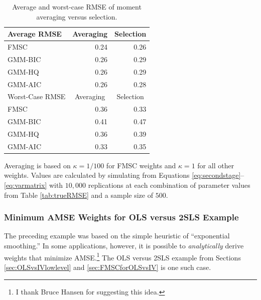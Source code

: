 \documentclass[12pt]{article}
\theoremstyle{definition}
\begin{document}
%
\begin{table}[!tbp]
 \begin{center}
\caption{Average and worst-case RMSE of moment averaging versus selection.}
\label{tab:avg}
\small
 \begin{tabular}{lrr}\hline\hline
\multicolumn{1}{l}{Average RMSE}&\multicolumn{1}{c}{Averaging}&\multicolumn{1}{c}{Selection}\tabularnewline
\hline
FMSC&0.24&0.26\tabularnewline
GMM-BIC&0.26&0.29\tabularnewline
GMM-HQ&0.26&0.29\tabularnewline
GMM-AIC&0.26&0.28\tabularnewline
\hline
\multicolumn{1}{l}{Worst-Case RMSE}&\multicolumn{1}{c}{Averaging}&\multicolumn{1}{c}{Selection}\tabularnewline
\hline
FMSC&0.36&0.33\tabularnewline
GMM-BIC&0.41&0.47\tabularnewline
GMM-HQ&0.36&0.39\tabularnewline
GMM-AIC&0.33&0.35\tabularnewline
\hline
\end{tabular}
\end{center}
\footnotesize
\begin{tablenotes}
	\item  Averaging is based on $\kappa = 1/100$ for FMSC weights and $\kappa = 1$ for all other weights. Values are calculated by simulating from Equations \ref{eq:secondstage}--\ref{eq:varmatrix} with $10,000$ replications at each combination of parameter values from Table \ref{tab:trueRMSE} and a sample size of $500$.
\end{tablenotes}
\end{table}

\subsubsection{Minimum AMSE Weights for OLS versus 2SLS Example}
The preceding example was based on the simple heuristic of ``exponential smoothing.'' 
In some applications, however, it is possible to \emph{analytically} derive weights that minimize AMSE.\footnote{I thank Bruce Hansen for suggesting this idea.} 
The OLS versus 2SLS example from Sections \ref{sec:OLSvsIVlowlevel} and \ref{sec:FMSCforOLSvsIV} is one such case. 
\end{document}
